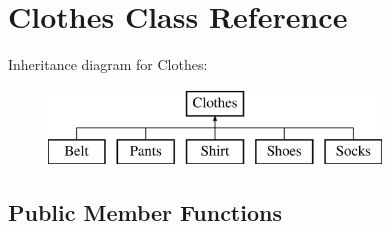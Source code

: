 \hypertarget{classClothes}{}\section{Clothes Class Reference}
\label{classClothes}
Inheritance diagram for Clothes\+:\begin{figure}[H]
\begin{center}
\leavevmode
\includegraphics[height=2.000000cm]{classClothes}
\end{center}
\end{figure}
\subsection*{Public Member Functions}
